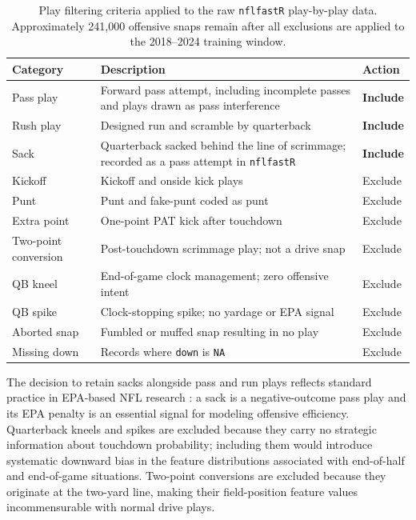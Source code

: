 \begin{table}[htbp]
  \centering
  \caption{Play filtering criteria applied to the raw \texttt{nflfastR}
           play-by-play data. Approximately 241,000 offensive snaps remain
           after all exclusions are applied to the 2018--2024 training window.}
  \label{tab:play-filtering}
  \begin{tabularx}{\textwidth}{lXl}
    \toprule
    \textbf{Category} & \textbf{Description} & \textbf{Action} \\
    \midrule
    Pass play          & Forward pass attempt, including incomplete passes
                         and plays drawn as pass interference
                       & \textbf{Include} \\
    Rush play          & Designed run and scramble by quarterback
                       & \textbf{Include} \\
    Sack               & Quarterback sacked behind the line of scrimmage;
                         recorded as a pass attempt in \texttt{nflfastR}
                       & \textbf{Include} \\
    \midrule
    Kickoff            & Kickoff and onside kick plays
                       & Exclude \\
    Punt               & Punt and fake-punt coded as punt
                       & Exclude \\
    Extra point        & One-point PAT kick after touchdown
                       & Exclude \\
    Two-point conversion & Post-touchdown scrimmage play; not a drive snap
                       & Exclude \\
    QB kneel           & End-of-game clock management; zero offensive intent
                       & Exclude \\
    QB spike           & Clock-stopping spike; no yardage or EPA signal
                       & Exclude \\
    Aborted snap       & Fumbled or muffed snap resulting in no play
                       & Exclude \\
    Missing down       & Records where \texttt{down} is \texttt{NA}
                       & Exclude \\
    \bottomrule
  \end{tabularx}
\end{table}

The decision to retain sacks alongside pass and run plays reflects
standard practice in EPA-based NFL research \parencite{yurko2019nflwar}:
a sack is a negative-outcome pass play and its EPA penalty is an essential
signal for modeling offensive efficiency. Quarterback kneels and spikes are
excluded because they carry no strategic information about touchdown
probability; including them would introduce systematic downward bias in the
feature distributions associated with end-of-half and end-of-game
situations. Two-point conversions are excluded because they originate at the
two-yard line, making their field-position feature values incommensurable
with normal drive plays.


